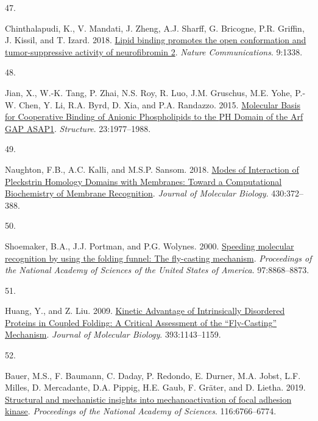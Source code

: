 \documentclass[
  twocolumn]{biophys-new-mod}
\newlength{\cslhangindent}
\newlength{\csllabelwidth}
\newlength{\cslentryspacingunit} %
\newenvironment{CSLReferences}[2] %
 {%
  \setlength{\parindent}{0pt}
  \ifodd #1
  \let\oldpar\par
  \def\par{\hangindent=\cslhangindent\oldpar}
  \fi
  \setlength{\parskip}{#2\cslentryspacingunit}
 }%
 {}
\newcommand{\CSLLeftMargin}[1]{\parbox[t]{\csllabelwidth}{#1}}
\newcommand{\CSLRightInline}[1]{\parbox[t]{\linewidth - \csllabelwidth}{#1}\break}
\begin{document}
\begin{CSLReferences}{0}{0}
\leavevmode{}%
\CSLLeftMargin{47. }%
\CSLRightInline{Chinthalapudi, K., V. Mandati, J. Zheng, A.J. Sharff, G.
Bricogne, P.R. Griffin, J. Kissil, and T. Izard. 2018.
\href{https://doi.org/10.1038/s41467-018-03648-4}{Lipid binding promotes
the open conformation and tumor-suppressive activity of neurofibromin
2}. \emph{Nature Communications}. 9:1338.}

\leavevmode{}%
\CSLLeftMargin{48. }%
\CSLRightInline{Jian, X., W.-K. Tang, P. Zhai, N.S. Roy, R. Luo, J.M.
Gruschus, M.E. Yohe, P.-W. Chen, Y. Li, R.A. Byrd, D. Xia, and P.A.
Randazzo. 2015.
\href{https://doi.org/10.1016/j.str.2015.08.008}{Molecular {Basis} for
{Cooperative Binding} of {Anionic Phospholipids} to the {PH Domain} of
the {Arf GAP ASAP1}}. \emph{Structure}. 23:1977--1988.}

\leavevmode{}%
\CSLLeftMargin{49. }%
\CSLRightInline{Naughton, F.B., A.C. Kalli, and M.S.P. Sansom. 2018.
\href{https://doi.org/10.1016/j.jmb.2017.12.011}{Modes of {Interaction}
of {Pleckstrin Homology Domains} with {Membranes}: {Toward} a
{Computational Biochemistry} of {Membrane Recognition}}. \emph{Journal
of Molecular Biology}. 430:372--388.}

\leavevmode{}%
\CSLLeftMargin{50. }%
\CSLRightInline{Shoemaker, B.A., J.J. Portman, and P.G. Wolynes. 2000.
\href{https://doi.org/10.1073/pnas.160259697}{Speeding molecular
recognition by using the folding funnel: The fly-casting mechanism}.
\emph{Proceedings of the National Academy of Sciences of the United
States of America}. 97:8868--8873.}

\leavevmode{}%
\CSLLeftMargin{51. }%
\CSLRightInline{Huang, Y., and Z. Liu. 2009.
\href{https://doi.org/10.1016/j.jmb.2009.09.010}{Kinetic {Advantage} of
{Intrinsically Disordered Proteins} in {Coupled
Folding}\textendash{{Binding Process}}: {A Critical Assessment} of the
{``{Fly-Casting}''} {Mechanism}}. \emph{Journal of Molecular Biology}.
393:1143--1159.}

\leavevmode{}%
\CSLLeftMargin{52. }%
\CSLRightInline{Bauer, M.S., F. Baumann, C. Daday, P. Redondo, E.
Durner, M.A. Jobst, L.F. Milles, D. Mercadante, D.A. Pippig, H.E. Gaub,
F. Gräter, and D. Lietha. 2019.
\href{https://doi.org/10.1073/pnas.1820567116}{Structural and
mechanistic insights into mechanoactivation of focal adhesion kinase}.
\emph{Proceedings of the National Academy of Sciences}. 116:6766--6774.}

\end{CSLReferences}
\end{document}
